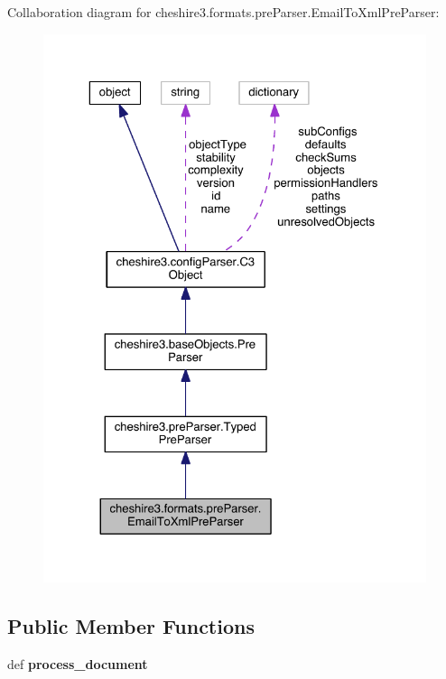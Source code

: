 Collaboration diagram for cheshire3.\-formats.\-pre\-Parser.\-Email\-To\-Xml\-Pre\-Parser\-:
\nopagebreak
\begin{figure}[H]
\begin{center}
\leavevmode
\includegraphics[width=325pt]{classcheshire3_1_1formats_1_1pre_parser_1_1_email_to_xml_pre_parser__coll__graph}
\end{center}
\end{figure}
\subsection*{Public Member Functions}
\begin{DoxyCompactItemize}
\item 
\hypertarget{classcheshire3_1_1formats_1_1pre_parser_1_1_email_to_xml_pre_parser_a855cdd3f55e3b069348db9818cd077a9}{def {\bfseries process\-\_\-document}}\label{classcheshire3_1_1formats_1_1pre_parser_1_1_email_to_xml_pre_parser_a855cdd3f55e3b069348db9818cd077a9}

\end{DoxyCompactItemize}
